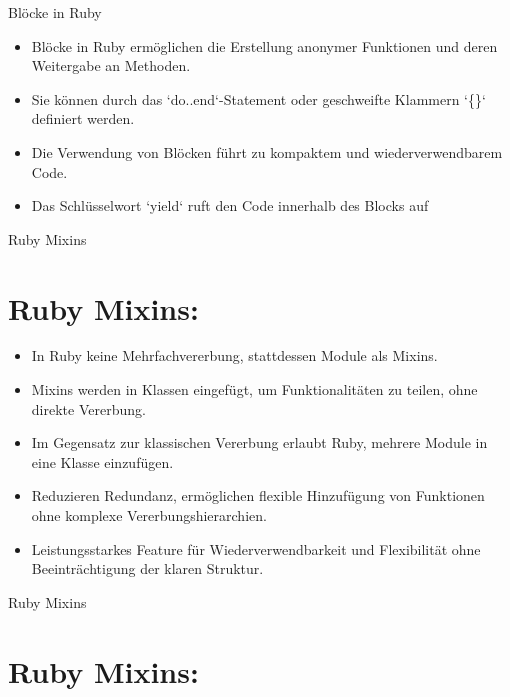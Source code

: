 \documentclass{beamer}
\begin{document}
\begin{frame}{Blöcke in Ruby}
  \begin{itemize}
    \item Blöcke in Ruby ermöglichen die Erstellung anonymer Funktionen und deren Weitergabe an Methoden.
    \item Sie können durch das `do..end`-Statement oder geschweifte Klammern `\{\}` definiert werden.

    \item Die Verwendung von Blöcken führt zu kompaktem und wiederverwendbarem Code.
    \item Das Schlüsselwort `yield` ruft den Code innerhalb des Blocks auf

  \end{itemize}

\end{frame}
\begin{frame}{Ruby Mixins}
\section*{Ruby Mixins:}

\begin{itemize}
  \item In Ruby keine Mehrfachvererbung, stattdessen Module als Mixins.
  \item Mixins werden in Klassen eingefügt, um Funktionalitäten zu teilen, ohne direkte Vererbung.
  \item Im Gegensatz zur klassischen Vererbung erlaubt Ruby, mehrere Module in eine Klasse einzufügen.
 
 
  \item Reduzieren Redundanz, ermöglichen flexible Hinzufügung von Funktionen ohne komplexe Vererbungshierarchien.
  \item Leistungsstarkes Feature für Wiederverwendbarkeit und Flexibilität ohne Beeinträchtigung der klaren Struktur.
\end{itemize}
\end{frame}
\begin{frame}{Ruby Mixins}
\section*{Ruby Mixins:}


\end{frame}
\end{document}
